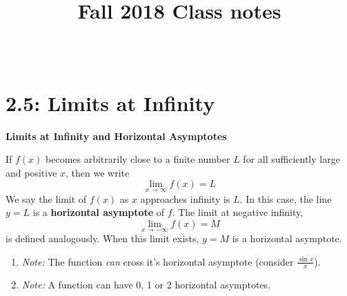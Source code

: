 \documentclass[answers]{exam}
\title{Fall 2018 Class notes}
\author{\thefname\ \thelname}
\begin{document}
\section{2.5: Limits at Infinity} 
      \begin{defn*}
        \textbf{Limits at Infinity and Horizontal Asymptotes} 

          If $f(x)$ becomes arbitrarily close to a finite number $L$ for all sufficiently large and positive $x$, then we write
            $$\lim_{x \to \infty} f(x)=L$$
          We say the limit of $f(x)$ as $x$ approaches infinity is $L$. In this case, the line $y=L$ is a \textbf{horizontal asymptote} of $f$. The limit at negative infinity, 
            $$\lim_{x \to -\infty} f(x)=M$$
          is defined analogously. When this limit exists, $y=M$ is a horizontal asymptote.
      \end{defn*}
      \begin{enumerate}[label=]
        \item\textit{Note:} The function \textit{can} cross it's horizontal asymptote (consider $\frac{\sin x}{x}$).
        \item\textit{Note:} A function can have 0, 1 or 2 horizontal asymptotes.
      \end{enumerate}
      
\end{document}
